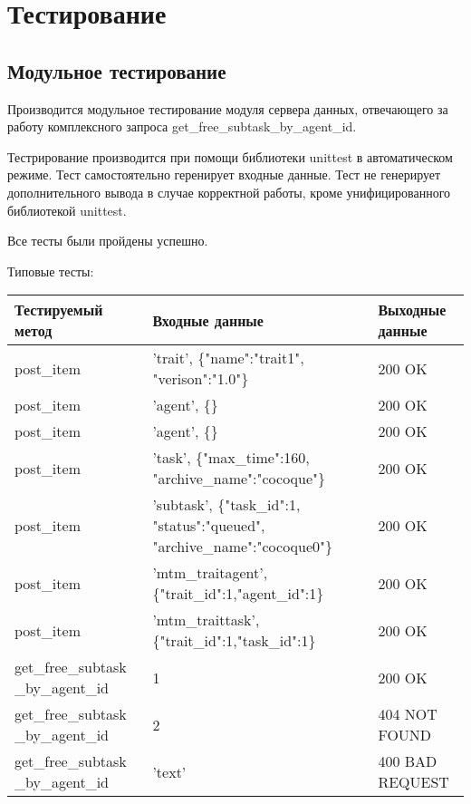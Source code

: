\documentclass[a4paper,12pt]{report}
\date{\today}
\numberwithin{equation}{section}
\begin{document}
\section{Тестирование}
\subsection{Модульное тестирование}
Производится модульное тестирование модуля сервера данных, отвечающего за работу комплексного запроса get\_free\_subtask\_by\_agent\_id.

Тестрирование производится при помощи библиотеки unittest в автоматическом режиме.
Тест самостоятельно геренирует входные данные.
Тест не генерирует дополнительного вывода в случае корректной работы, кроме унифицированного библиотекой unittest.

Все тесты были пройдены успешно.

Типовые тесты:

\begin{table}[h]
  \begin{tabu}{|L{3.5cm}|X[c]|L{5cm}|}
  	\hline
  	Тестируемый метод                  & Входные данные                                                             & Выходные данные \\ \hline
  	post\_item                         & 'trait', \{"name":"trait1", "verison":"1.0"\}                              & 200 OK          \\ \hline
  	post\_item                         & 'agent', \{\}                                                              & 200 OK          \\ \hline
  	post\_item                         & 'agent', \{\}                                                              & 200 OK          \\ \hline
  	post\_item                         & 'task', \{"max\_time":160, "archive\_name":"cocoque"\}                     & 200 OK          \\ \hline
  	post\_item                         & 'subtask', \{"task\_id":1, "status":"queued", "archive\_name":"cocoque0"\} & 200 OK          \\ \hline
  	post\_item                         & 'mtm\_traitagent', \{"trait\_id":1,"agent\_id":1\}                         & 200 OK          \\ \hline
  	post\_item                         & 'mtm\_traittask', \{"trait\_id":1,"task\_id":1\}                           & 200 OK          \\ \hline
  	get\_free\_subtask \_by\_agent\_id & 1                                                                          & 200 OK          \\ \hline
  	get\_free\_subtask \_by\_agent\_id & 2                                                                          & 404 NOT FOUND   \\ \hline
  	get\_free\_subtask \_by\_agent\_id & 'text'                                                                     & 400 BAD REQUEST \\ \hline
  \end{tabu}
\end{table}
\end{document}
